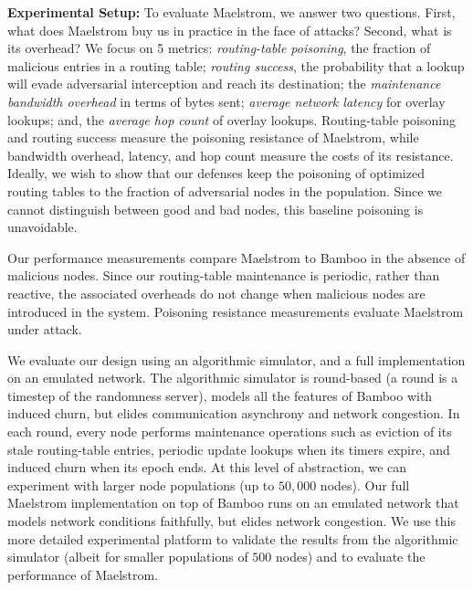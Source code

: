 \documentclass[10pt,twocolumn]{article}
\renewcommand{\paragraph}[1]{\textbf{#1:}}
\begin{document}
\paragraph{Experimental Setup}
To evaluate Maelstrom, we answer two questions.  First,
what does Maelstrom buy us in practice in the face of attacks?  Second,
what is its overhead?  We focus on 5 metrics: \emph{routing-table
poisoning}, the fraction of malicious entries in a routing table;
\emph{routing success}, the probability that a lookup will evade
adversarial interception and reach its
destination; the \emph{maintenance bandwidth overhead} in terms of bytes
sent; \emph{average network latency} for overlay lookups; and, the
\emph{average hop count} of overlay lookups.
Routing-table poisoning and routing success measure the poisoning
resistance of Maelstrom, while bandwidth overhead, latency, and hop
count measure the costs of its resistance.  Ideally, we wish to show that our
defenses keep the poisoning of optimized routing tables to the fraction of adversarial nodes
in the population.  Since we cannot distinguish between good and bad
nodes, this baseline poisoning is unavoidable.

Our performance measurements compare Maelstrom 
to Bamboo in the absence of malicious nodes.  Since our routing-table maintenance
is periodic, rather than reactive, the associated overheads do not change when
malicious nodes are introduced in the system.  Poisoning resistance
measurements evaluate Maelstrom under attack.

We evaluate our design using an algorithmic simulator, and a full
implementation on an emulated network.  The algorithmic simulator is
round-based (a round is a timestep of the randomness server), models
all the features of Bamboo with induced churn, but elides communication asynchrony and
network congestion. 
In each round, every node performs maintenance
operations such as eviction of its stale routing-table entries, periodic
update lookups when its timers expire, and induced churn when its epoch
ends.  At this level of abstraction, we can experiment with larger
node populations (up to $50,000$ nodes).
Our full Maelstrom implementation on top of Bamboo runs on
an emulated network that models
network conditions faithfully, but elides network congestion.  We use
this more detailed experimental platform to validate the results from
the algorithmic simulator (albeit for smaller populations of $500$
nodes) and to evaluate the performance of Maelstrom.
\end{document}
